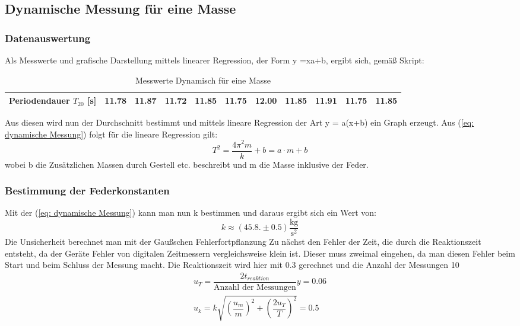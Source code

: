 \documentclass[bibliography=totocnumbered]{scrartcl}
\begin{document}
	\subsection{Dynamische Messung für eine Masse}
	
	\subsubsection{Datenauswertung}
	Als Messwerte und grafische Darstellung mittels linearer Regression, der Form y =xa+b, ergibt sich, gemäß Skript\smartcite{MullerPG.2007b}:
	
	\begin{table}[ht!]
		\centering
		\caption{Messwerte Dynamisch für eine Masse}
		\begin{tabular}{|c|c|c|c|c|c|c|c|c|c|c|}
			\hline
			Periodendauer $ T_{20} $ [s] & 11.78 & 11.87 & 11.72 & 11.85 & 11.75 & 12.00 & 11.85 & 11.91 & 11.75 & 11.85 \\
			\hline
		\end{tabular}
		\label{tab: dynamisch für eine Masse}
	\end{table}
	
	Aus diesen wird nun der Durchschnitt bestimmt und mittels lineare Regression der Art
	y = a(x+b) ein Graph erzeugt.
	Aus (\ref{eq: dynamische Messung}) folgt für die lineare Regression gilt:
	\begin{equation}
		T^{2}=\dfrac{4\pi^{2}m}{k}+b=a\cdot m+b
	\end{equation}
	wobei b die Zusätzlichen Massen durch Gestell etc. beschreibt und m die Masse inklusive
	der Feder.
	\subsubsection{Bestimmung der Federkonstanten}
	Mit der (\ref{eq: dynamische Messung}) kann man nun k bestimmen und daraus ergibt sich ein Wert von:
	\begin{equation}
		k\approx (45.8.\pm 0.5)\dfrac{\text{kg}}{\text{s}^{2}}
	\end{equation}
	Die Unsicherheit berechnet man mit der Gaußschen Fehlerfortpflanzung
	Zu nächst den Fehler der Zeit, die durch die Reaktionszeit entsteht, da der Geräte Fehler
	von digitalen Zeitmessern vergleichsweise klein ist. Dieser muss zweimal eingehen, da
	man diesen Fehler beim Start und beim Schluss der Messung macht.
	Die Reaktionszeit wird hier mit 0.3 gerechnet und die Anzahl der Messungen 10
	\begin{align}
		u_{T}=\dfrac{2 t_{reaktion}}{\text{Anzahl der Messungen}}y=0.06\\
		u_{k}=k\sqrt{\left(\dfrac{u_{m}}{m}\right)^{2}+\left(\dfrac{2u_{T}}{T}\right)^{2}}=0.5
	\end{align}
	
\end{document}
